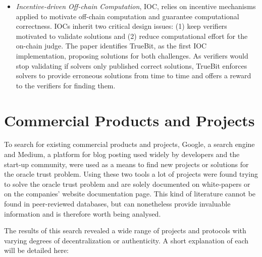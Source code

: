 \begin{itemize}

  \item \textit{Incentive-driven Off-chain Computation}, IOC, relies on incentive mechanisms applied to motivate off-chain computation and guarantee computational correctness. IOCs inherit two critical design issues: (1) keep verifiers motivated to validate solutions and (2) reduce computational effort for the on-chain judge. The paper identifies TrueBit, as the first IOC implementation, proposing solutions for both challenges. As verifiers would stop validating if solvers only published correct solutions, TrueBit enforces solvers to provide erroneous solutions from time to time and offers a reward to the verifiers for finding them.


\end{itemize}



\section{Commercial Products and Projects}


To search for existing commercial products and projects, Google, a search engine and Medium, a platform for blog posting used widely by developers and the start-up community, were used as a means to find new projects or solutions for the oracle trust problem. Using these two tools a lot of projects were found trying to solve the oracle trust problem and are solely documented on white-papers or on the companies' website documentation page. This kind of literature cannot be found in peer-reviewed databases, but can nonetheless provide invaluable information and is therefore worth being analysed.

The results of this search revealed a wide range of projects and protocols with varying degrees of decentralization or authenticity. A short explanation of each will be detailed here:

